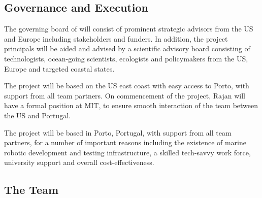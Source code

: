 


\ifkeck
\else
\newpage
\fi
\subsection{Governance and Execution}


The governing board of \pro will consist of prominent strategic
advisors from the US and Europe including stakeholders and funders. In
addition, the project principals will be aided and advised by a
scientific advisory board consisting of technologists, ocean-going
scientists, ecologists and policymakers from the US, Europe and
targeted coastal states.

\ifkeck

The project will be based on the US east coast with easy access to
Porto, with support from all team partners. On commencement of the
project, Rajan will have a formal position at MIT, to ensure smooth
interaction of the team between the US and Portugal. 

\else

The project will be based in Porto, Portugal, with support from all
team partners, for a number of important reasons including the
existence of marine robotic development and testing infrastructure, a
skilled tech-savvy work force, university support and overall
cost-effectiveness.  %
\fi

\subsection{The Team}

